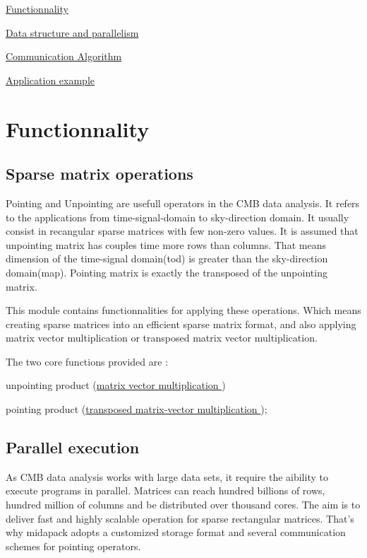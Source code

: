 
\begin{DoxyItemize}
\item \hyperlink{functionnality}{Functionnality}
\item \hyperlink{data_struct_parall}{Data structure and parallelism}
\item \hyperlink{algorithm}{Communication Algorithm}
\item \hyperlink{example}{Application example} 
\end{DoxyItemize}\section{Functionnality}\label{functionnality}
\hypertarget{functionnality_operations}{}\subsection{Sparse matrix operations}\label{functionnality_operations}
Pointing and Unpointing are usefull operators in the C\-M\-B data analysis. It refers to the applications from time-\/signal-\/domain to sky-\/direction domain. It usually consist in recangular sparse matrices with few non-\/zero values. It is assumed that unpointing matrix has couples time more rows than columns. That means dimension of the time-\/signal domain(tod) is greater than the sky-\/direction domain(map). Pointing matrix is exactly the transposed of the unpointing matrix.

This module contains functionnalities for applying these operations. Which means creating sparse matrices into an efficient sparse matrix format, and also applying matrix vector multiplication or transposed matrix vector multiplication.

The two core functions provided are \-: \begin{DoxyItemize}
\item unpointing product (\hyperlink{mapmat_8c_af757d9249d31d2839b3376ac2e3f5574}{matrix vector multiplication }) \item pointing product (\hyperlink{mapmat_8c_a1a51d7e8153d33045482100bbd07d0a9}{transposed matrix-\/vector multiplication });\end{DoxyItemize}
\hypertarget{functionnality_execution}{}\subsection{Parallel execution}\label{functionnality_execution}
As C\-M\-B data analysis works with large data sets, it require the aibility to execute programs in parallel. Matrices can reach hundred billions of rows, hundred million of columns and be distributed over thousand cores. The aim is to deliver fast and highly scalable operation for sparse rectangular matrices. That's why midapack adopts a customized storage format and several communication schemes for pointing operators.

